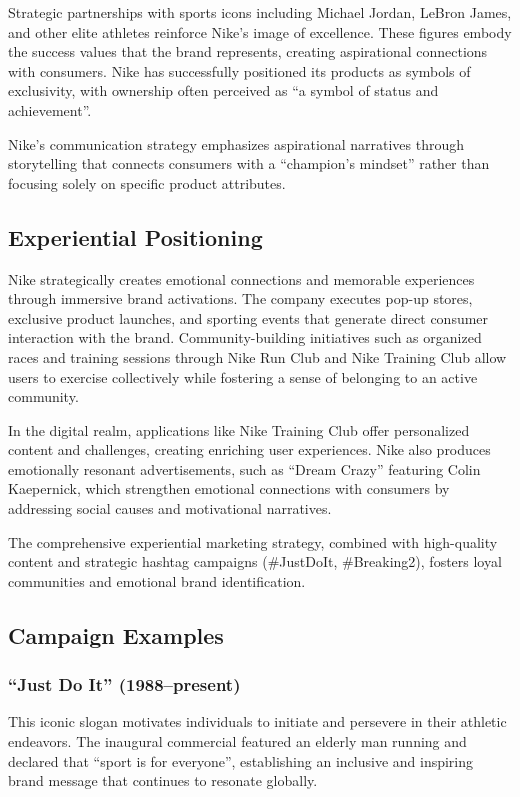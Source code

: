 \documentclass[letterpaper, 12pt]{article}
\begin{document}
Strategic partnerships with sports icons including Michael Jordan, LeBron James, and other elite athletes reinforce Nike's image of excellence. These figures embody the success values that the brand represents, creating aspirational connections with consumers. Nike has successfully positioned its products as symbols of exclusivity, with ownership often perceived as ``a symbol of status and achievement''.

Nike's communication strategy emphasizes aspirational narratives through storytelling that connects consumers with a ``champion's mindset'' rather than focusing solely on specific product attributes.

\subsection{Experiential Positioning}

Nike strategically creates emotional connections and memorable experiences through immersive brand activations. The company executes pop-up stores, exclusive product launches, and sporting events that generate direct consumer interaction with the brand. Community-building initiatives such as organized races and training sessions through Nike Run Club and Nike Training Club allow users to exercise collectively while fostering a sense of belonging to an active community.

In the digital realm, applications like Nike Training Club offer personalized content and challenges, creating enriching user experiences. Nike also produces emotionally resonant advertisements, such as ``Dream Crazy'' featuring Colin Kaepernick, which strengthen emotional connections with consumers by addressing social causes and motivational narratives.

The comprehensive experiential marketing strategy, combined with high-quality content and strategic hashtag campaigns (\#JustDoIt, \#Breaking2), fosters loyal communities and emotional brand identification.

\subsection{Campaign Examples}

\subsubsection{``Just Do It'' (1988--present)}
This iconic slogan motivates individuals to initiate and persevere in their athletic endeavors. The inaugural commercial featured an elderly man running and declared that ``sport is for everyone'', establishing an inclusive and inspiring brand message that continues to resonate globally.
\end{document}
